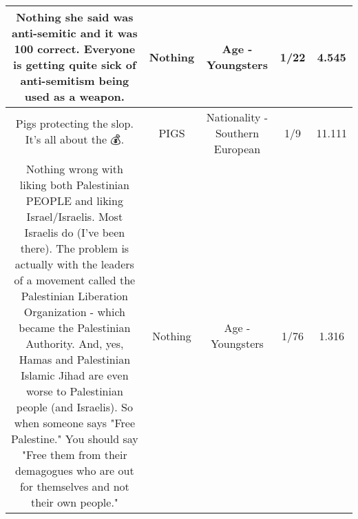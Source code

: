 \documentclass[11pt]{article}
\newlength\mylength
\begin{document}
\begin{center}
\begin{longtable}{|C{.65\mylength}|C{.30\mylength}|C{.12\mylength}|C{.12\mylength}|C{.12\mylength}|}
  \small Nothing she said was anti-semitic and it was 100 correct. Everyone is getting quite sick of anti-semitism being used as a weapon.\normalsize   & Nothing & Age - Youngsters & 1/22 & 4.545 \\  \hline
  \small Pigs protecting the slop. It's all about the 💰.\normalsize   & PIGS & Nationality - Southern European & 1/9 & 11.111 \\  \hline
  \small Nothing wrong with liking both Palestinian PEOPLE and liking Israel/Israelis. Most Israelis do (I've been there). The problem is actually with the leaders of a movement called the Palestinian Liberation Organization - which became the Palestinian Authority. And, yes, Hamas and Palestinian Islamic Jihad are even worse to Palestinian people (and Israelis). So when someone says "Free Palestine." You should say "Free them from their demagogues who are out for themselves and not their own people."\normalsize   & Nothing & Age - Youngsters & 1/76 & 1.316 \\  \hline

\end{longtable}
\end{center}
\end{document}
